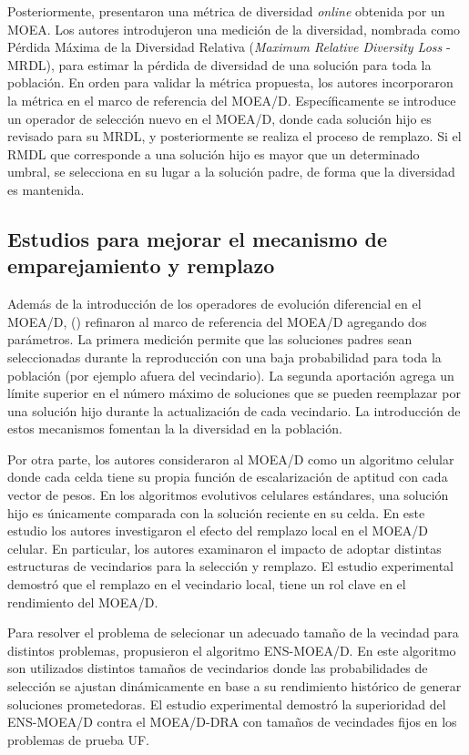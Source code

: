 Posteriormente, \cite{gee2015online} presentaron una métrica de diversidad  \textit{online} obtenida por un MOEA.
%
Los autores introdujeron una medición de la diversidad, nombrada como Pérdida Máxima de la Diversidad Relativa (\textit{Maximum Relative Diversity Loss} - MRDL), para estimar la pérdida de diversidad de una solución para toda la población.
%
En orden para validar la métrica propuesta, los autores incorporaron la métrica en el marco de referencia del MOEA/D.
%
Específicamente se introduce un operador de selección nuevo en el MOEA/D, donde cada solución hijo es revisado para su MRDL, y posteriormente se realiza el proceso de remplazo.
%
Si el RMDL que corresponde a una solución hijo es mayor que un determinado umbral, se selecciona en su lugar a la solución padre, de forma que la diversidad es mantenida.


\subsection*{Estudios para mejorar el mecanismo de emparejamiento y remplazo}

Además de la introducción de los operadores de evolución diferencial en el MOEA/D, (\cite{li2009multiobjective}) refinaron al marco de referencia del MOEA/D agregando dos parámetros.
%
La primera medición permite que las soluciones padres sean seleccionadas durante la reproducción con una baja probabilidad para toda la población (por ejemplo afuera del vecindario).
%
La segunda aportación agrega un límite superior en el número máximo de soluciones que se pueden reemplazar por una solución hijo durante la actualización de cada vecindario.
%
La introducción de estos mecanismos fomentan la la diversidad en la población.


Por otra parte, los autores \cite{ishibuchi2009effects} consideraron al MOEA/D como un algoritmo celular donde cada celda tiene su propia función de escalarización de aptitud con cada vector de pesos.
%
En los algoritmos evolutivos celulares estándares, una solución hijo es únicamente comparada con la solución reciente en su celda.
%
En este estudio los autores investigaron el efecto del remplazo local en el MOEA/D celular.
%
En particular, los autores examinaron el impacto de adoptar distintas estructuras de vecindarios para la selección y remplazo.
%
El estudio experimental demostró que el remplazo en el vecindario local, tiene un rol clave en el rendimiento del MOEA/D.
%

Para resolver el problema de selecionar un adecuado tamaño de la vecindad para distintos problemas, \cite{zhao2012decomposition} propusieron el algoritmo ENS-MOEA/D.
%
En este algoritmo son utilizados distintos tamaños de vecindarios donde las probabilidades de selección se ajustan dinámicamente en base a su rendimiento histórico de generar soluciones prometedoras.
%
El estudio experimental demostró la superioridad del ENS-MOEA/D contra el MOEA/D-DRA con tamaños de vecindades fijos en los problemas de prueba UF.
%


